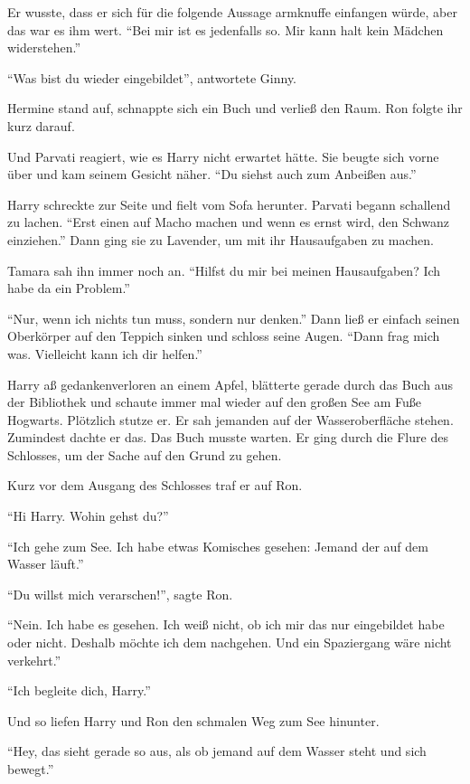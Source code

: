 Er wusste, dass er sich für die folgende Aussage armknuffe einfangen würde, aber das war es ihm wert. \enquote{Bei mir ist es jedenfalls so. Mir kann halt kein Mädchen widerstehen.}

\enquote{Was bist du wieder eingebildet}, antwortete Ginny.

Hermine stand auf, schnappte sich ein Buch und verließ den Raum. Ron folgte ihr kurz darauf.

Und Parvati reagiert, wie es Harry nicht erwartet hätte. Sie beugte sich vorne über und kam seinem Gesicht näher. \enquote{Du siehst auch zum Anbeißen aus.}

Harry schreckte zur Seite und fielt vom Sofa herunter. Parvati begann schallend zu lachen. \enquote{Erst einen auf Macho machen und wenn es ernst wird, den Schwanz einziehen.} Dann ging sie zu Lavender, um mit ihr Hausaufgaben zu machen.

Tamara sah ihn immer noch an. \enquote{Hilfst du mir bei meinen Hausaufgaben? Ich habe da ein Problem.}

\enquote{Nur, wenn ich nichts tun muss, sondern nur denken.} Dann ließ er einfach seinen Oberkörper auf den Teppich sinken und schloss seine Augen. \enquote{Dann frag mich was. Vielleicht kann ich dir helfen.}

\trenn

Harry aß gedankenverloren an einem Apfel, blätterte gerade durch das Buch aus der Bibliothek und schaute immer mal wieder auf den großen See am Fuße Hogwarts. Plötzlich stutze er. Er sah jemanden auf der Wasseroberfläche stehen. Zumindest dachte er das. Das Buch musste warten. Er ging durch die Flure des Schlosses, um der Sache auf den Grund zu gehen.

Kurz vor dem Ausgang des Schlosses traf er auf Ron.

\enquote{Hi Harry. Wohin gehst du?}

\enquote{Ich gehe zum See. Ich habe etwas Komisches gesehen: Jemand der auf dem Wasser läuft.}

\enquote{Du willst mich verarschen!}, sagte Ron.

\enquote{Nein. Ich habe es gesehen. Ich weiß nicht, ob ich mir das nur eingebildet habe oder nicht. Deshalb möchte ich dem nachgehen. Und ein Spaziergang wäre nicht verkehrt.}

\enquote{Ich begleite dich, Harry.}

Und so liefen Harry und Ron den schmalen Weg zum See hinunter.

\enquote{Hey, das sieht gerade so aus, als ob jemand auf dem Wasser steht und sich bewegt.}

